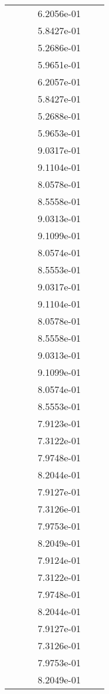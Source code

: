 \begin{xltabular}{\textwidth}{r|rS[table-format=1.3e+2]S[table-format=1.4e+2]S[table-format=1.4e+2]S[table-format=-1.5]}
&  &  & 6.2056e-01 & & \\
&  &  & 5.8427e-01 & & \\
&  &  & 5.2686e-01 & & \\
&  &  & 5.9651e-01 & & \\
&  &  & 6.2057e-01 & & \\
&  &  & 5.8427e-01 & & \\
&  &  & 5.2688e-01 & & \\
&  &  & 5.9653e-01 & & \\
&  &  & 9.0317e-01 & & \\
&  &  & 9.1104e-01 & & \\
&  &  & 8.0578e-01 & & \\
&  &  & 8.5558e-01 & & \\
&  &  & 9.0313e-01 & & \\
&  &  & 9.1099e-01 & & \\
&  &  & 8.0574e-01 & & \\
&  &  & 8.5553e-01 & & \\
&  &  & 9.0317e-01 & & \\
&  &  & 9.1104e-01 & & \\
&  &  & 8.0578e-01 & & \\
&  &  & 8.5558e-01 & & \\
&  &  & 9.0313e-01 & & \\
&  &  & 9.1099e-01 & & \\
&  &  & 8.0574e-01 & & \\
&  &  & 8.5553e-01 & & \\
&  &  & 7.9123e-01 & & \\
&  &  & 7.3122e-01 & & \\
&  &  & 7.9748e-01 & & \\
&  &  & 8.2044e-01 & & \\
&  &  & 7.9127e-01 & & \\
&  &  & 7.3126e-01 & & \\
&  &  & 7.9753e-01 & & \\
&  &  & 8.2049e-01 & & \\
&  &  & 7.9124e-01 & & \\
&  &  & 7.3122e-01 & & \\
&  &  & 7.9748e-01 & & \\
&  &  & 8.2044e-01 & & \\
&  &  & 7.9127e-01 & & \\
&  &  & 7.3126e-01 & & \\
&  &  & 7.9753e-01 & & \\
&  &  & 8.2049e-01 & & \\

\end{xltabular}
